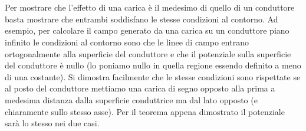 \documentclass[
10pt, %
a4paper, %
oneside, %
headinclude,footinclude, %
BCOR5mm, %
]{scrartcl}
\begin{document}
\\\\
Per mostrare che l'effetto di una carica è il medesimo di quello di un conduttore basta mostrare che entrambi soddisfano le stesse condizioni al contorno. Ad esempio, per calcolare il campo generato da una carica su un conduttore piano infinito le condizioni al contorno sono che le linee di campo entrano ortogonalmente alla superficie del conduttore e che il potenziale sulla superficie del conduttore è nullo (lo poniamo nullo in quella regione essendo definito a meno di una costante). Si dimostra facilmente che le stesse condizioni sono rispettate se al posto del conduttore mettiamo una carica di segno opposto alla prima a medesima distanza dalla superficie conduttrice ma dal lato opposto (e chiaramente sullo stesso asse). Per il teorema appena dimostrato il potenziale sarà lo stesso nei due casi. 
\end{document}
